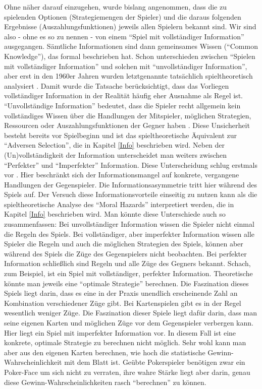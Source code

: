 Ohne näher darauf einzugehen, wurde bislang angenommen, dass die zu spielenden Optionen (Strategiemengen der Spieler) und die daraus folgenden Ergebnisse (Auszahlungsfunktionen) jeweils allen Spielern bekannt sind. Wir sind also - ohne es so zu nennen - von einem "`Spiel mit vollständiger Information"' ausgegangen. Sämtliche Informationen sind dann gemeinsames Wissen ("`Common Knowledge"'), das \textcite{Aumann1976} formal beschrieben hat. Schon \textcite{VonNeumann1944} unterschieden zwischen "`Spielen mit vollständiger Information"' und solchen mit "`unvollständiger Information"', aber erst in den 1960er Jahren wurden letztgenannte tatsächlich spieltheoretisch analysiert \parencite[S. 137]{Harsanyi1994}. Damit wurde die Tatsache berücksichtigt, dass das Vorliegen vollständiger Information in der Realität häufig eher Ausnahme als Regel ist. "`Unvollständige Information"' bedeutet, dass die Spieler recht allgemein kein vollständiges Wissen über die Handlungen der Mitspieler, möglichen Strategien, Ressourcen oder Auszahlungsfunktionen der Gegner haben \parencite[S. 137]{Harsanyi1994}. Diese Unsicherheit besteht bereits vor Spielbeginn und ist das spieltheoretische Äquivalent zur "`Adversen Selection"', die in Kapitel \ref{Info} beschrieben wird. Neben der (Un)vollständigkeit der Information unterscheidet man weiters zwischen "`Perfekter"' und "`Imperfekter"' Information. Diese Unterscheidung schlug \textcite{Selten1965} erstmals vor \parencite[S. 166]{Nash1994}. Hier beschränkt sich der Informationsmangel auf konkrete, vergangene Handlungen der Gegenspieler.  Die Informationsasymmetrie tritt hier während des Spiels auf. Der Versuch diese Informationsvorteile einseitig zu nutzen kann als die spieltheoretische Analyse des "`Moral Hazards"' interpretiert werden, die in Kapitel \ref{Info} beschrieben wird. Man könnte diese Unterschiede auch so zusammenfassen: Bei unvollständiger Information wissen die Spieler nicht einmal die Regeln des Spiels. Bei vollständiger, aber imperfekter Information wissen alle Spieler die Regeln und auch die möglichen Strategien des Spiels, können aber während des Spiels die Züge des Gegenspielers nicht beobachten. Bei perfekter Information schließlich sind Regeln und alle Züge des Gegners bekannt. Schach, zum Beispiel, ist ein Spiel mit vollständiger, perfekter Information. Theoretische könnte man jeweils eine "`optimale Strategie"' berechnen. Die Faszination dieses Spiels liegt darin, dass es eine in der Praxis unendlich erscheinende Zahl an Kombination verschiedener Züge gibt. Bei Kartenspielen gibt es in der Regel wesentlich weniger Züge. Die Faszination dieser Spiele liegt dafür darin, dass man seine eigenen Karten und möglichen Züge vor dem Gegenspieler verbergen kann. Hier liegt ein Spiel mit imperfekter Information vor. In diesem Fall ist eine konkrete, optimale Strategie zu berechnen nicht möglich. Sehr wohl kann man aber aus den eigenen Karten berechnen, wie hoch die statistische Gewinn-Wahrscheinlichkeit mit dem Blatt ist. Geübte Pokerspieler benötigen zwar ein Poker-Face um sich nicht zu verraten, ihre wahre Stärke liegt aber darin, genau diese Gewinn-Wahrscheinlichkeiten rasch "`berechnen"' zu können.

